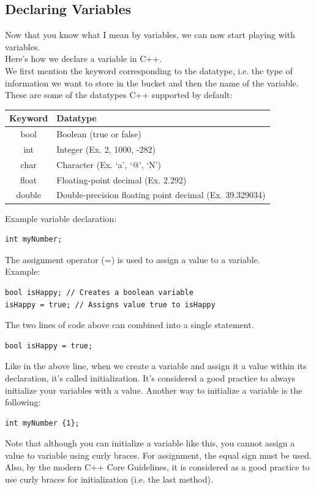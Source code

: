 \documentclass[letterpaper, 12pt]{book}
\begin{document}
\subsection{Declaring Variables}
Now that you know what I mean by variables, we can now start playing with variables.\\
Here's how we declare a variable in C++.\\
We first mention the keyword corresponding to the datatype, i.e. the type of information we want to store in the bucket and then the name of the variable. These are some of the datatypes C++ supported by default:
\begin{center}
	\begin{tabular}{ |c|l| } 
		\hline
		Keyword & Datatype \\ 
		\hline
		bool & Boolean (true or false)\\
		int & Integer (Ex. 2, 1000, -282)\\
		char & Character (Ex. `a', `@', `N')\\
		float & Floating-point decimal (Ex. 2.292)\\
		double & Double-precision floating point decimal (Ex. 39.329034)\\
		\hline
	\end{tabular}
\end{center}
Example variable declaration:
\begin{lstlisting}
int myNumber;
\end{lstlisting}
The assignment operator (=) is used to assign a value to a variable.\\
Example:
\begin{lstlisting}
bool isHappy; // Creates a boolean variable
isHappy = true; // Assigns value true to isHappy
\end{lstlisting}
The two lines of code above can combined into a single statement.
\begin{lstlisting}
bool isHappy = true;
\end{lstlisting}
Like in the above line, when we create a variable and assign it a value within its declaration, it's called initialization. It's considered a good practice to always initialize your variables with a value. Another way to initialize a variable is the following:
\begin{lstlisting}
int myNumber {1};
\end{lstlisting}
Note that although you can initialize a variable like this, you cannot assign a value to variable using curly braces. For assignment, the equal sign must be used.\\
Also, by the modern C++ Core Guidelines, it is considered as a good practice to use curly braces for initialization (i.e. the last method).
\end{document}
